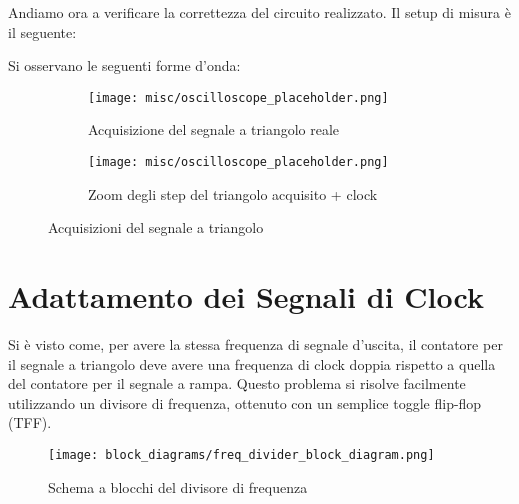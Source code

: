 
Andiamo ora a verificare la correttezza del circuito realizzato. Il setup di misura è il
seguente:
\medskip


Si osservano le seguenti forme d'onda:
\medskip

\begin{figure}[ht]
    \centering

    \begin{subfigure}{.5\textwidth}
        \centering
        \texttt{[image: misc/oscilloscope\_placeholder.png]}
        \caption{Acquisizione del segnale a triangolo reale}
        \label{acq_triangle}
    \end{subfigure}%
    \begin{subfigure}{.5\textwidth}
        \centering
        \texttt{[image: misc/oscilloscope\_placeholder.png]}
        \caption{Zoom degli step del triangolo acquisito + clock}
        \label{acq_triangle_steps}
    \end{subfigure}

    \caption{Acquisizioni del segnale a triangolo}
    \label{acq_triangle_signals}
\end{figure}


\section{Adattamento dei Segnali di Clock}


Si è visto come, per avere la stessa frequenza di segnale d'uscita, il contatore per il segnale
a triangolo deve avere una frequenza di clock doppia rispetto a quella del contatore per il
segnale a rampa. Questo problema si risolve facilmente utilizzando un divisore di frequenza,
ottenuto con un semplice toggle flip-flop (TFF).
\medskip

\begin{figure}[ht]
    \centering
    \texttt{[image: block\_diagrams/freq\_divider\_block\_diagram.png]}
    \caption{Schema a blocchi del divisore di frequenza}
    \label{freq_divider_block_diagram}
\end{figure}

